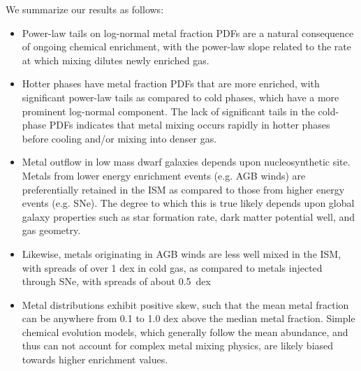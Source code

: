 We summarize our results as follows:
\begin{itemize}



\item Power-law tails on log-normal metal fraction PDFs are a natural consequence of ongoing chemical enrichment, with the power-law slope related to the rate at which mixing dilutes newly enriched gas.

\item Hotter phases have metal fraction PDFs that are more enriched, with significant power-law tails as compared to cold phases, which have a more prominent log-normal component. The lack of significant tails in the cold-phase PDFs indicates that metal mixing occurs rapidly in hotter phases before cooling and/or mixing into denser gas.

\item Metal outflow in low mass dwarf galaxies depends upon nucleosynthetic site. Metals from lower energy enrichment events (e.g. AGB winds) are preferentially retained in the ISM as compared to those from higher energy events (e.g. SNe). The degree to which this is true likely depends upon global galaxy properties such as star formation rate, dark matter potential well, and gas geometry.

\item Likewise, metals originating in AGB winds are less well mixed in the ISM, with spreads of over 1 dex in cold gas, as compared to metals injected through SNe, with spreads of about 0.5~dex

\item Metal distributions exhibit positive skew, such that the mean metal fraction can be anywhere from 0.1 to 1.0 dex above the median metal fraction. Simple chemical evolution models, which generally follow the mean abundance, and thus can not account for complex metal mixing physics, are likely biased towards higher enrichment values.


\end{itemize}

